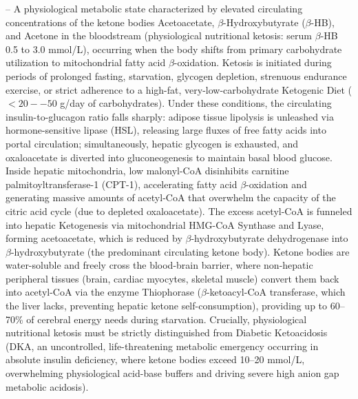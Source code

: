 -- A physiological metabolic state characterized by elevated circulating concentrations of the ketone bodies Acetoacetate, $\beta$-Hydroxybutyrate ($\beta$-HB), and Acetone in the bloodstream (physiological nutritional ketosis: serum $\beta$-HB 0.5 to 3.0 mmol/L), occurring when the body shifts from primary carbohydrate utilization to mitochondrial fatty acid $\beta$-oxidation. Ketosis is initiated during periods of prolonged fasting, starvation, glycogen depletion, strenuous endurance exercise, or strict adherence to a high-fat, very-low-carbohydrate Ketogenic Diet ($<20--50$ g/day of carbohydrates). Under these conditions, the circulating insulin-to-glucagon ratio falls sharply: adipose tissue lipolysis is unleashed via hormone-sensitive lipase (HSL), releasing large fluxes of free fatty acids into portal circulation; simultaneously, hepatic glycogen is exhausted, and oxaloacetate is diverted into gluconeogenesis to maintain basal blood glucose. Inside hepatic mitochondria, low malonyl-CoA disinhibits carnitine palmitoyltransferase-1 (CPT-1), accelerating fatty acid $\beta$-oxidation and generating massive amounts of acetyl-CoA that overwhelm the capacity of the citric acid cycle (due to depleted oxaloacetate). The excess acetyl-CoA is funneled into hepatic Ketogenesis via mitochondrial HMG-CoA Synthase and Lyase, forming acetoacetate, which is reduced by $\beta$-hydroxybutyrate dehydrogenase into $\beta$-hydroxybutyrate (the predominant circulating ketone body). Ketone bodies are water-soluble and freely cross the blood-brain barrier, where non-hepatic peripheral tissues (brain, cardiac myocytes, skeletal muscle) convert them back into acetyl-CoA via the enzyme Thiophorase ($\beta$-ketoacyl-CoA transferase, which the liver lacks, preventing hepatic ketone self-consumption), providing up to 60--70\% of cerebral energy needs during starvation. Crucially, physiological nutritional ketosis must be strictly distinguished from Diabetic Ketoacidosis (DKA, an uncontrolled, life-threatening metabolic emergency occurring in absolute insulin deficiency, where ketone bodies exceed 10--20 mmol/L, overwhelming physiological acid-base buffers and driving severe high anion gap metabolic acidosis).

